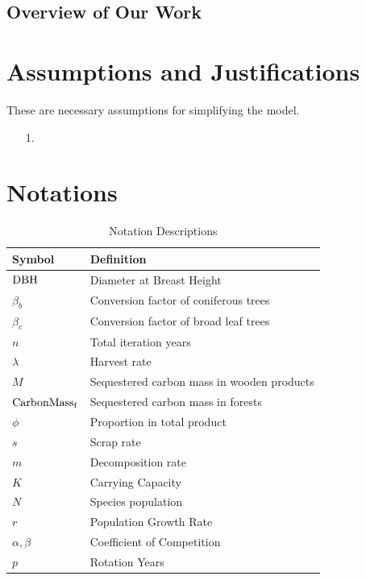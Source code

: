 \documentclass{mcmthesis}
\numberwithin{figure}{section}
\numberwithin{table}{section}
\numberwithin{equation}{section}
\begin{document}
\subsection{Overview of Our Work}




\section{Assumptions and Justifications}
These are necessary assumptions for simplifying the model.
\begin{enumerate}
  \item [1.] 
\end{enumerate}

\newpage

\section{Notations}

\renewcommand\arraystretch{1.5}

\begin{table}[htpb!]
  \centering
  \caption{Notation Descriptions}
  \begin{tabular}{m{2.5cm}<{\centering}|m{12.5cm}<{\centering}}
  \toprule[1.5pt]
  \textbf{Symbol} & \textbf{Definition} \\ \hline
  $ \rm{DBH} $ & Diameter at Breast Height \\
  $ \beta_b $ & Conversion factor of coniferous trees\\
  $\beta_c$ & Conversion factor of broad leaf trees\\
  $ n $ & Total iteration years\\
  $ \lambda $ & Harvest rate\\
  $ M $ & Sequestered carbon mass in wooden products \\
  $ \rm{CarbonMass_f} $ & Sequestered carbon mass in forests \\
  $ \phi $ & Proportion in total product\\
  $ s $ & Scrap rate\\
  $ m $ & Decomposition rate \\
  $ K $ & Carrying Capacity \\
  $ N $ & Species population \\
  $ r $ & Population Growth Rate\\
  $ \alpha,\beta $ & Coefficient of Competition\\
  $ p $ & Rotation Years \\
  

  \bottomrule[1.5pt]
  \end{tabular}
\end{table}
\end{document}
